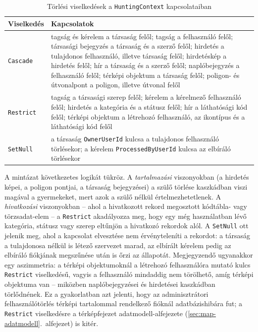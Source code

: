 \begin{table}[htbp]
	\centering
	\caption{Törlési viselkedések a \texttt{HuntingContext} kapcsolataiban}
	\label{tab:delete-behavior}
	\begin{tabular}{|l|p{10.2cm}|}
		\hline
		\textbf{Viselkedés} & \textbf{Kapcsolatok} \\
		\hline
		\texttt{Cascade} &
		tagság és kérelem a társaság felől; tagság a felhasználó felől; társasági bejegyzés a
		társaság és a szerző felől; hirdetés a tulajdonos felhasználó, illetve társaság felől;
		hirdetéskép a hirdetés felől; hír a társaság és a szerző felől; naplóbejegyzés a
		felhasználó felől; térképi objektum a társaság felől; poligon- és útvonalpont a
		poligon, illetve útvonal felől \\
		\hline
		\texttt{Restrict} &
		tagság a társasági szerep felől; kérelem a kérelmező felhasználó felől; hirdetés a
		kategória és a státusz felől; hír a láthatósági kód felől; térképi objektum a
		létrehozó felhasználó, az ikontípus és a láthatósági kód felől \\
		\hline
		\texttt{SetNull} &
		a társaság \texttt{OwnerUserId} kulcsa a tulajdonos felhasználó törlésekor; a kérelem
		\texttt{ProcessedByUserId} kulcsa az elbíráló törlésekor \\
		\hline
	\end{tabular}
\end{table}

A mintázat következetes logikát tükröz. A \emph{tartalmazási} viszonyokban (a hirdetés képei, a
poligon pontjai, a társaság bejegyzései) a szülő törlése kaszkádban viszi magával a gyermekeket,
mert azok a szülő nélkül értelmezhetetlenek. A \emph{hivatkozási} viszonyokban -- ahol a
hivatkozott rekord megosztott kódtábla- vagy törzsadat-elem -- a \texttt{Restrict} akadályozza meg,
hogy egy még használatban lévő kategória, státusz vagy szerep eltűnjön a hivatkozó rekordok alól.
A \texttt{SetNull} ott jelenik meg, ahol a kapcsolat elvesztése nem érvényteleníti a rekordot:
a társaság a tulajdonosa nélkül is létező szervezet marad, az elbírált kérelem pedig az elbíráló
fiókjának megszűnése után is őrzi az állapotát. Megjegyzendő ugyanakkor egy aszimmetria: a térképi
objektumoknál a létrehozó felhasználóra mutató kulcs \texttt{Restrict} viselkedésű, vagyis a
felhasználó mindaddig nem törölhető, amíg térképi objektuma van -- miközben naplóbejegyzései és
hirdetései kaszkádban törlődnének. Ez a gyakorlatban azt jelenti, hogy az adminisztrátori
felhasználótörlés térképi tartalommal rendelkező fióknál adatbázishibára fut; a \texttt{Restrict}
viselkedésre a térképfejezet adatmodell-alfejezete (\ref{sec:map-adatmodell}.~alfejezet) is kitér.

